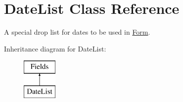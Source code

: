 \hypertarget{class_date_list}{\section{Date\-List Class Reference}
\label{class_date_list}
}


A special drop list for dates to be used in \hyperlink{class_form}{Form}.  


Inheritance diagram for Date\-List\-:\begin{figure}[H]
\begin{center}
\leavevmode
\includegraphics[height=2.000000cm]{class_date_list}
\end{center}
\end{figure}

